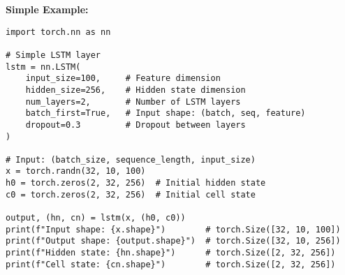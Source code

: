 \documentclass[11pt,a4paper]{book}
\begin{document}
\textbf{Simple Example:}
\begin{verbatim}
import torch.nn as nn

# Simple LSTM layer
lstm = nn.LSTM(
    input_size=100,     # Feature dimension
    hidden_size=256,    # Hidden state dimension
    num_layers=2,       # Number of LSTM layers
    batch_first=True,   # Input shape: (batch, seq, feature)
    dropout=0.3         # Dropout between layers
)

# Input: (batch_size, sequence_length, input_size)
x = torch.randn(32, 10, 100)
h0 = torch.zeros(2, 32, 256)  # Initial hidden state
c0 = torch.zeros(2, 32, 256)  # Initial cell state

output, (hn, cn) = lstm(x, (h0, c0))
print(f"Input shape: {x.shape}")        # torch.Size([32, 10, 100])
print(f"Output shape: {output.shape}")  # torch.Size([32, 10, 256])
print(f"Hidden state: {hn.shape}")      # torch.Size([2, 32, 256])
print(f"Cell state: {cn.shape}")        # torch.Size([2, 32, 256])
\end{verbatim}
\end{document}
